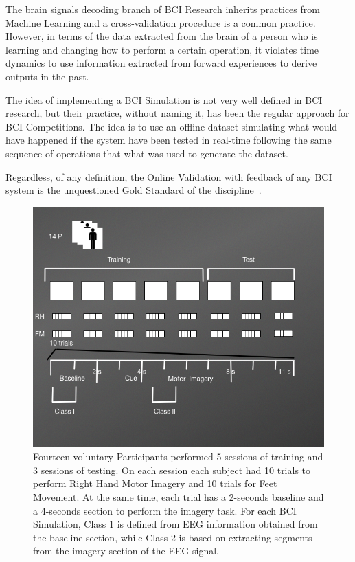 \begin{story}
The brain signals decoding branch of BCI Research inherits practices from Machine Learning and a cross-validation procedure is a common practice.  However, in terms of the data extracted from the brain of a person who is learning and changing how to perform a certain operation, it violates time dynamics to use information extracted from forward experiences to derive outputs in the past.

The idea of implementing a BCI Simulation is not very well defined in BCI research, but their practice, without naming it, has been the regular approach for BCI Competitions. The idea is to use an offline dataset simulating what would have happened if the system have been tested in real-time following the same sequence of operations that what was used to generate the dataset.

Regardless, of any definition, the Online Validation with feedback of any BCI system is the unquestioned Gold Standard of the discipline~\cite{WolpawJonathanR2012}.
\end{story}


\begin{figure}[]
\centering
\includegraphics[scale=0.6]{images/DatasetIIIDiagram2.png}
\caption[Motor Imagery Experimental Protocol]{Fourteen voluntary Participants performed 5 sessions of training and 3 sessions of testing.  On each session each subject had 10 trials to perform Right Hand Motor Imagery and 10 trials for Feet Movement.  At the same time, each trial has a 2-seconds baseline and a 4-seconds section to perform the imagery task.  For each BCI Simulation, Class 1 is defined from EEG information obtained from the baseline section, while Class 2 is based on extracting segments from the imagery section of the EEG signal.}
\label{fig:midatasetdiagram}
\end{figure}



